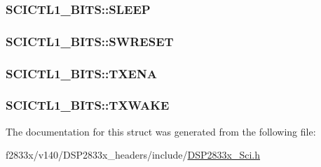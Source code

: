 \subsubsection[{S\+L\+E\+E\+P}]{ S\+C\+I\+C\+T\+L1\+\_\+\+B\+I\+T\+S\+::\+S\+L\+E\+E\+P}\label{struct_s_c_i_c_t_l1___b_i_t_s_ad43cc24495aa5d6a373b78bcb400781a}
\hypertarget{struct_s_c_i_c_t_l1___b_i_t_s_a8e8db58883800d100a7b2a8377067445}{}
\subsubsection[{S\+W\+R\+E\+S\+E\+T}]{ S\+C\+I\+C\+T\+L1\+\_\+\+B\+I\+T\+S\+::\+S\+W\+R\+E\+S\+E\+T}\label{struct_s_c_i_c_t_l1___b_i_t_s_a8e8db58883800d100a7b2a8377067445}
\hypertarget{struct_s_c_i_c_t_l1___b_i_t_s_a033c62efc7475bb7e662bce4be705cd7}{}
\subsubsection[{T\+X\+E\+N\+A}]{ S\+C\+I\+C\+T\+L1\+\_\+\+B\+I\+T\+S\+::\+T\+X\+E\+N\+A}\label{struct_s_c_i_c_t_l1___b_i_t_s_a033c62efc7475bb7e662bce4be705cd7}
\hypertarget{struct_s_c_i_c_t_l1___b_i_t_s_af3b1d1ace1efe6a5f380d3e6635b1148}{}
\subsubsection[{T\+X\+W\+A\+K\+E}]{ S\+C\+I\+C\+T\+L1\+\_\+\+B\+I\+T\+S\+::\+T\+X\+W\+A\+K\+E}\label{struct_s_c_i_c_t_l1___b_i_t_s_af3b1d1ace1efe6a5f380d3e6635b1148}


The documentation for this struct was generated from the following file\+:\begin{DoxyCompactItemize}
\item 
f2833x/v140/\+D\+S\+P2833x\+\_\+headers/include/\hyperlink{_d_s_p2833x___sci_8h}{D\+S\+P2833x\+\_\+\+Sci.\+h}\end{DoxyCompactItemize}
